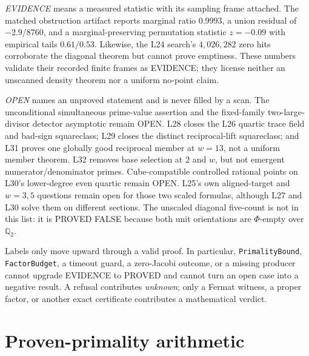 \documentclass[11pt]{amsart}%
\newcommand{\Q}{\mathbb{Q}}
\begin{document}
\emph{EVIDENCE} means a measured statistic with its sampling frame attached.
The matched obstruction artifact reports marginal ratio \(0.9993\), a union
residual of \(-2.9/8760\), and a marginal-preserving permutation statistic
\(z=-0.09\) with empirical tails \(0.61/0.53\).  Likewise, the L24 search's
\(4{,}026{,}282\) zero hits corroborate the diagonal theorem but cannot prove
emptiness.  These numbers validate their recorded finite frames as EVIDENCE;
they license neither an unscanned density theorem nor a uniform no-point
claim.

\emph{OPEN} names an unproved statement and is never filled by a scan.
The unconditional simultaneous prime-value assertion and the
fixed-family two-large-divisor detector asymptotic remain OPEN.  L28
closes the L26 quartic trace field and bad-sign squareclass; L29 closes
the distinct reciprocal-lift squareclass; and L31 proves one globally
good reciprocal member at \(w=13\), not a uniform member theorem.  L32
removes base selection at \(2\) and \(w\), but not emergent
numerator/denominator primes.  Cube-compatible controlled rational
points on L30's lower-degree even quartic remain OPEN.  L25's own
aligned-target and \(w=3,5\) questions remain open for those two scaled
formulas, although L27 and L30 solve them on different sections.
The unscaled diagonal five-count is not
in this list: it is PROVED FALSE because both unit orientations are
\(\Phi\)-empty over \(\Q_2\).

Labels only move upward through a valid proof.  In particular,
\texttt{PrimalityBound}, \texttt{FactorBudget}, a timeout guard, a
zero-Jacobi outcome, or a missing producer cannot upgrade EVIDENCE to PROVED
and cannot turn an open case into a negative result.  A refusal contributes
\emph{unknown}; only a Fermat witness, a proper factor, or another exact
certificate contributes a mathematical verdict.

\section{Proven-primality arithmetic}
\end{document}
